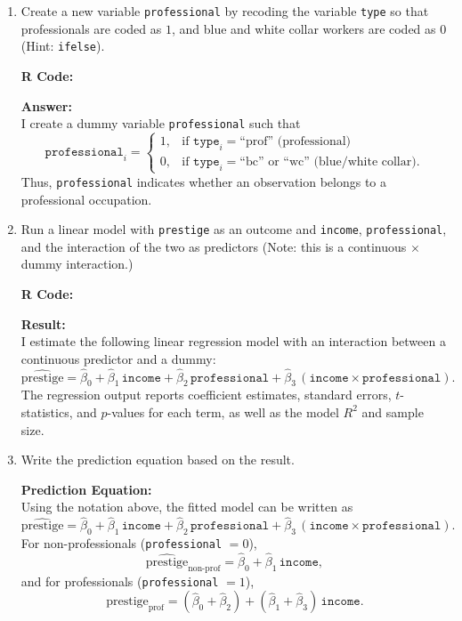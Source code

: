\documentclass[12pt,letterpaper]{article}
\begin{document}
\begin{enumerate}
	
	\item [(a)]
	Create a new variable \texttt{professional} by recoding the variable \texttt{type} so that professionals are coded as $1$, and blue and white collar workers are coded as $0$ (Hint: \texttt{ifelse}).
	
	
	\noindent\textbf{R Code:}
	
	
	\noindent\textbf{Answer:}\\
	I create a dummy variable \texttt{professional} such that
	\[
	\texttt{professional}_i = 
	\begin{cases}
		1, & \text{if } \texttt{type}_i = \text{``prof'' (professional)}\\
		0, & \text{if } \texttt{type}_i = \text{``bc'' or ``wc''} \text{ (blue/white collar)}.
	\end{cases}
	\]
	Thus, \texttt{professional} indicates whether an observation belongs to a professional occupation.
	
	\vspace{0.4cm}
	
	\item [(b)]
	Run a linear model with \texttt{prestige} as an outcome and \texttt{income}, \texttt{professional}, and the interaction of the two as predictors (Note: this is a continuous $\times$ dummy interaction.)
	
	  \noindent\textbf{R Code:}
	
	
	\noindent\textbf{Result:}\\
	I estimate the following linear regression model with an interaction between a continuous predictor and a dummy:
	\[
	\widehat{\text{prestige}} 
	= \hat{\beta}_0 
	+ \hat{\beta}_1\,\texttt{income}
	+ \hat{\beta}_2\,\texttt{professional}
	+ \hat{\beta}_3\,(\texttt{income} \times \texttt{professional}).
	\]
	The regression output reports coefficient estimates, standard errors, $t$-statistics, and $p$-values for each term, as well as the model $R^2$ and sample size.
	
	\vspace{0.4cm}
	
	\item [(c)]
	Write the prediction equation based on the result.
	
	
	\noindent\textbf{Prediction Equation:}\\
	Using the notation above, the fitted model can be written as
	\[
	\widehat{\text{prestige}} 
	= \hat{\beta}_0 
	+ \hat{\beta}_1\,\texttt{income}
	+ \hat{\beta}_2\,\texttt{professional}
	+ \hat{\beta}_3\,(\texttt{income} \times \texttt{professional}).
	\]
	For non-professionals (\texttt{professional} $=0$),
	\[
	\widehat{\text{prestige}}_{\text{non-prof}} 
	= \hat{\beta}_0 + \hat{\beta}_1\,\texttt{income},
	\]
	and for professionals (\texttt{professional} $=1$),
	\[
	\widehat{\text{prestige}}_{\text{prof}} 
	= (\hat{\beta}_0 + \hat{\beta}_2) + (\hat{\beta}_1 + \hat{\beta}_3)\,\texttt{income}.
	\]
	

\end{enumerate}
\end{document}
